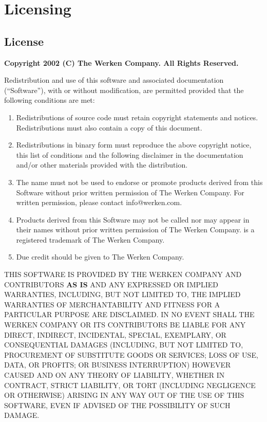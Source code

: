\chapter{Licensing}

\section{License}

\small

{\center \textbf{\textsf{Copyright 2002 (C) The Werken Company. All Rights Reserved.}}\\}

\bigskip

Redistribution and use of this software and associated documentation
(``Software''), with or without modification, are permitted provided
that the following conditions are met:

\begin{enumerate}
	\item Redistributions of source code must retain copyright
   statements and notices.  Redistributions must also contain a
   copy of this document.
 
	\item Redistributions in binary form must reproduce the
   above copyright notice, this list of conditions and the
   following disclaimer in the documentation and/or other
   materials provided with the distribution.
 
	\item The name \drools{} must not be used to endorse or promote
   products derived from this Software without prior written
   permission of The Werken Company.  For written permission,
   please contact info@werken.com.
 
	\item Products derived from this Software may not be called \drools{}
   nor may \drools{} appear in their names without prior written
   permission of The Werken Company. \drools{} is a registered
   trademark of The Werken Company.
 
	\item Due credit should be given to The Werken Company. 
\end{enumerate}
 
THIS SOFTWARE IS PROVIDED BY THE WERKEN COMPANY AND CONTRIBUTORS
\textbf{AS IS} AND ANY EXPRESSED OR IMPLIED WARRANTIES, INCLUDING, BUT
NOT LIMITED TO, THE IMPLIED WARRANTIES OF MERCHANTABILITY AND
FITNESS FOR A PARTICULAR PURPOSE ARE DISCLAIMED.  IN NO EVENT SHALL
THE WERKEN COMPANY OR ITS CONTRIBUTORS BE LIABLE FOR ANY DIRECT,
INDIRECT, INCIDENTAL, SPECIAL, EXEMPLARY, OR CONSEQUENTIAL DAMAGES
(INCLUDING, BUT NOT LIMITED TO, PROCUREMENT OF SUBSTITUTE GOODS OR
SERVICES; LOSS OF USE, DATA, OR PROFITS; OR BUSINESS INTERRUPTION)
HOWEVER CAUSED AND ON ANY THEORY OF LIABILITY, WHETHER IN CONTRACT,
STRICT LIABILITY, OR TORT (INCLUDING NEGLIGENCE OR OTHERWISE)
ARISING IN ANY WAY OUT OF THE USE OF THIS SOFTWARE, EVEN IF ADVISED
OF THE POSSIBILITY OF SUCH DAMAGE.

